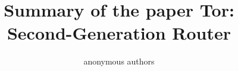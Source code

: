 \documentclass[11pt,twocolumn,a4paper,DIV=calc]{scrartcl}
\begin{document}
\title{Summary of the paper Tor: Second-Generation Router}
\author{anonymous authors}
\date{}
\maketitle



\newpage
\clearpage






 

\end{document}
